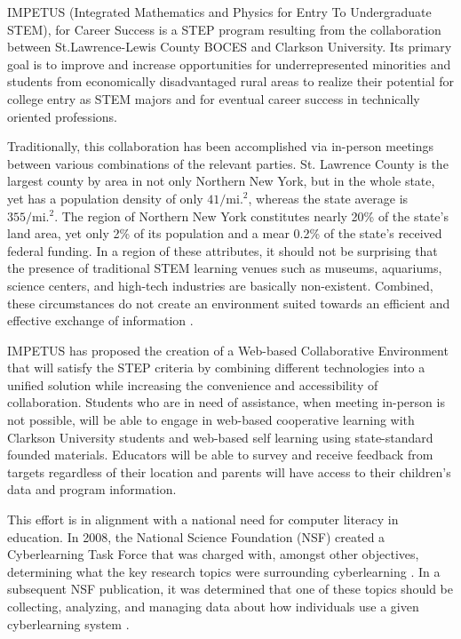 IMPETUS (Integrated Mathematics and Physics for Entry To Undergraduate STEM), for Career Success is a STEP program resulting from the collaboration between St.Lawrence-Lewis County BOCES and Clarkson University. Its primary goal is to improve and increase opportunities for underrepresented minorities and students from economically disadvantaged rural areas to realize their potential for college entry as STEM majors and for eventual career success in technically oriented professions.

Traditionally, this collaboration has been accomplished via in-person meetings between various combinations of the relevant parties. St. Lawrence County is the largest county by area in not only Northern New York, but in the whole state, yet has a population density of only $41/\mathrm{mi.}^2$, whereas the state average is $355/\mathrm{mi.}^2$. The region of Northern New York constitutes nearly 20\% of the state's land area, yet only 2\% of its population and a mear 0.2\% of the state's received federal funding. In a region of these attributes, it should not be surprising that the presence of traditional STEM learning venues such as museums, aquariums, science centers, and high-tech industries are basically non-existent. Combined, these circumstances do not create an environment suited towards an efficient and effective exchange of information \cite{nny-prism}.

IMPETUS has proposed the creation of a Web-based Collaborative Environment that will satisfy the STEP criteria by combining different technologies into a unified solution while increasing the convenience and accessibility of collaboration. Students who are in need of assistance, when meeting in-person is not possible, will be able to engage in web-based cooperative learning with Clarkson University students and web-based self learning using state-standard founded materials. Educators will be able to survey and receive feedback from targets regardless of their location and parents will have access to their children's data and program information.

This effort is in alignment with a national need for computer literacy in education. In 2008, the National Science Foundation (NSF) created a Cyberlearning Task Force that was charged with, amongst other objectives, determining what the key research topics were surrounding cyberlearning \cite{nsf-taskforce}. In a subsequent NSF publication, it was determined that one of these topics should be collecting, analyzing, and managing data about how individuals use a given cyberlearning system \cite{nsf-cyberlearning}.

